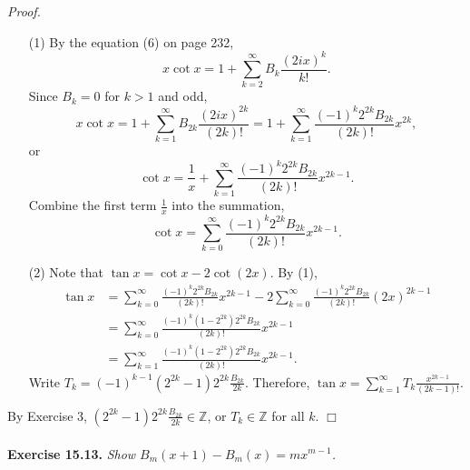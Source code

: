 \documentclass{article}
\begin{document}
\emph{Proof.}
\begin{enumerate}
\item[(1)]
By the equation (6) on page 232,
$$x \cot x = 1 + \sum_{k=2}^{\infty} B_k \frac{(2ix)^k}{k!}.$$
Since $B_k = 0$ for $k > 1$ and odd,
$$x \cot x
= 1 + \sum_{k=1}^{\infty} B_{2k} \frac{(2ix)^{2k}}{(2k)!}
= 1 + \sum_{k=1}^{\infty} \frac{(-1)^k 2^{2k}B_{2k}}{(2k)!} x^{2k},$$
or
$$\cot x
= \frac{1}{x} + \sum_{k=1}^{\infty} \frac{(-1)^k 2^{2k}B_{2k}}{(2k)!} x^{2k-1}.$$
Combine the first term $\frac{1}{x}$ into the summation,
$$\cot x = \sum_{k=0}^{\infty} \frac{(-1)^k 2^{2k}B_{2k}}{(2k)!} x^{2k-1}.$$
\item[(2)]
Note that $\tan x = \cot x - 2 \cot(2x)$.
By (1),
\begin{align*}
\tan x
&= \sum_{k=0}^{\infty} \frac{(-1)^k 2^{2k}B_{2k}}{(2k)!} x^{2k-1}
- 2 \sum_{k=0}^{\infty} \frac{(-1)^k 2^{2k}B_{2k}}{(2k)!} (2x)^{2k-1} \\
&= \sum_{k=0}^{\infty} \frac{(-1)^k (1 - 2^{2k}) 2^{2k} B_{2k}}{(2k)!} x^{2k-1} \\
&= \sum_{k=1}^{\infty} \frac{(-1)^k (1 - 2^{2k}) 2^{2k} B_{2k}}{(2k)!} x^{2k-1}.
\end{align*}
Write $T_k = (-1)^{k-1} (2^{2k} - 1) 2^{2k} \frac{B_{2k}}{2k}$.
Therefore, $\tan x = \sum_{k=1}^{\infty} T_k \frac{x^{2k - 1}}{(2k - 1)!}$.
\end{enumerate}
By Exercise 3, $(2^{2k} - 1) 2^{2k} \frac{B_{2k}}{2k} \in \mathbb{Z}$,
or $T_k \in \mathbb{Z}$ for all $k$.
$\Box$ \\\\



\textbf{Exercise 15.13.}
\emph{Show $B_m(x+1) - B_m(x) = mx^{m-1}$.} \\
\end{document}
